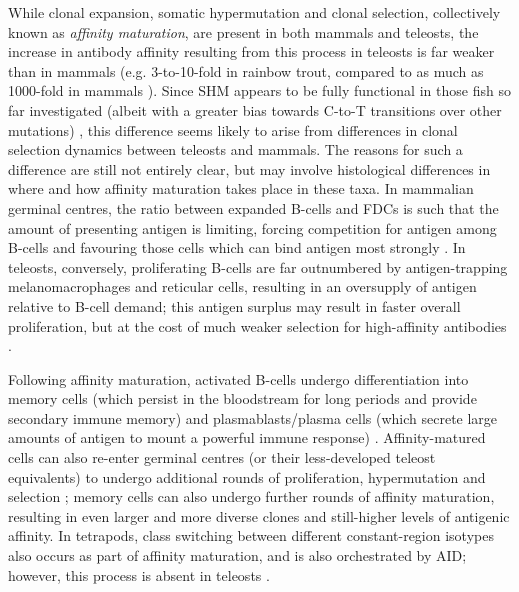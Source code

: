 While clonal expansion, somatic hypermutation and clonal selection, collectively known as \textit{affinity maturation}, are present in both mammals and teleosts, the increase in antibody affinity resulting from this process in teleosts is far weaker than in mammals (e.g. 3-to-10-fold in rainbow trout, compared to as much as 1000-fold in mammals \parencite{magor2015affinity}). Since SHM appears to be fully functional in those fish so far investigated (albeit with a greater bias towards C-to-T transitions over other mutations) \parencite{magor2015affinity}, this difference seems likely to arise from differences in clonal selection dynamics between teleosts and mammals. The reasons for such a difference are still not entirely clear, but may involve histological differences in where and how affinity maturation takes place in these taxa. In mammalian germinal centres, the ratio between expanded B-cells and FDCs is such that the amount of presenting antigen is limiting, forcing competition for antigen among B-cells and favouring those cells which can bind antigen most strongly \parencite{magor2015affinity}. In teleosts, conversely, proliferating B-cells are far outnumbered by antigen-trapping melanomacrophages and reticular cells, resulting in an oversupply of antigen relative to B-cell demand; this antigen surplus may result in faster overall proliferation, but at the cost of much weaker selection for high-affinity antibodies \parencite{magor2015affinity}.

Following affinity maturation, activated B-cells undergo differentiation into memory cells (which persist in the bloodstream for long periods and provide secondary immune memory) \parencite{victora2012gc,mayer2018memory} and plasmablasts/plasma cells (which secrete large amounts of antigen to mount a powerful immune response) \parencite{howard2006quality,dunnwalters2010bcellageing,victora2012gc}. Affinity-matured cells can also re-enter germinal centres (or their less-developed teleost equivalents) to undergo additional rounds of proliferation, hypermutation and selection \parencite{howard2006quality,victora2012gc}; memory cells can also undergo further rounds of affinity maturation, resulting in even larger and more diverse clones and still-higher levels of antigenic affinity. In tetrapods, class switching between different constant-region isotypes also occurs as part of affinity maturation, and is also orchestrated by AID; however, this process is absent in teleosts \parencite{magor2015affinity}.

